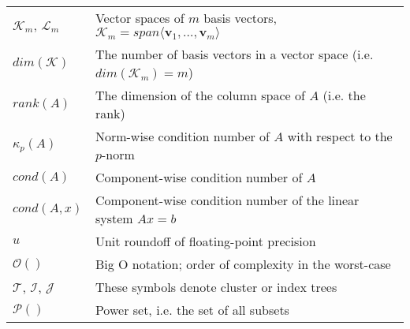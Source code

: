 \begin{tabular}{ll}
  $\mathcal{K}_m$, $\mathcal{L}_m$ & Vector spaces of $m$ basis vectors,  $\mathcal{K}_m=span\langle \bm{v}_1, \dots, \bm{v}_{m} \rangle$ \\
  $dim(\mathcal{K})$ & The number of basis vectors in a vector space (i.e. $dim(\mathcal{K}_m)=m$) \\
  $rank(A)$ & The dimension of the column space of $A$ (i.e. the rank)\\
  $\kappa_{p}(A)$ & Norm-wise condition number of $A$ with respect to the $p$-norm \\
  $cond(A)$ & Component-wise condition number of $A$ \\
  $cond(A, x)$ & Component-wise condition number of the linear system $Ax=b$ \\
  $u$      & Unit roundoff of floating-point precision \\
  $\mathcal{O}()$ & Big O notation; order of complexity in the worst-case\\
  $\mathcal{T}$, $\mathcal{I}$, $\mathcal{J}$ & These symbols denote cluster or index trees \\
  $\mathcal{P}()$ & Power set, i.e. the set of all subsets \\

\end{tabular}
\vspace{0.5cm}